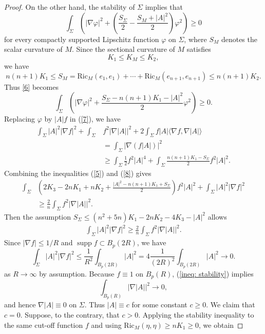 \documentclass[amssymb,amstex,amsmath,11pt]{article}
\numberwithin{equation}{section}
\theoremstyle{plain}
\theoremstyle{definition}
\theoremstyle{remark}
\def\Ric{\textrm{Ric}}
\begin{document}
\begin{proof}
On the other hand, the stability of $\Sigma$ implies that
\begin{equation}\label{6}
\int_\Sigma \left( |\nabla \varphi|^2 + \left(\frac{S_\Sigma}{2}-\frac{S_M+|A|^2}{2}\right)\varphi^2 \right)\ge 0
\end{equation}
for every compactly supported Lipschitz function $\varphi$ on $\Sigma$, where $S_M$ denotes the scalar curvature of $M$. Since the sectional curvature of $M$ satisfies
$$
K_1\le K_M\le K_2,
$$
we have
$$
n(n+1)K_1
\le
S_M
=
\Ric_M(e_1,e_1)+\cdots+\Ric_M(e_{n+1},e_{n+1})
\le
n(n+1)K_2.
$$
Thus \eqref{6} becomes
\begin{equation}\label{7}
\int_\Sigma \left(|\nabla \varphi|^2+\frac{S_\Sigma-n(n+1)K_1-|A|^2}{2}\varphi^2\right)\ge 0.
\end{equation}
Replacing $\varphi$ by $|A|f$ in (\ref{7}), we have
\begin{align}\label{8}
\int_\Sigma |A|^2|\nabla f|^2 + \int_\Sigma & f^2|\nabla |A||^2 +  2\int_\Sigma f|A|\langle \nabla f,\nabla|A| \rangle \nonumber \\
&=\int_\Sigma |\nabla (f|A|)|^2 \nonumber \\
& \geq \int_\Sigma \frac{1}{2}f^2|A|^4 + \int_\Sigma \frac{n(n+1)K_1-S_{\Sigma}}{2}f^2|A|^2.
\end{align}
Combining the inequalities (\ref{5}) and (\ref{8}) gives
\begin{align}\label{9}
\int_\Sigma &\left(2K_3-2nK_1+nK_2 +\frac{|A|^2-n(n+1)K_1+S_{\Sigma}}{2}\right) f^2|A|^2 +  \int_\Sigma |A|^2|\nabla f|^2 \nonumber\\
& \geq \frac{2}{n}\int_\Sigma f^2|\nabla |A||^2.
\end{align}
Then the assumption $S_{\Sigma} \leq (n^2+5n)K_1-2n K_2-4 K_3-|A|^2$ allows
\begin{align}
\int_\Sigma |A|^2|\nabla f|^2 \geq \frac{2}{n}\int_\Sigma f^2|\nabla |A||^2. \label{ineq: stability}
\end{align}
Since $|\nabla f|\le 1/R$ and $\operatorname{supp}f\subset B_p(2R)$, we have
$$
\int_\Sigma |A|^2|\nabla f|^2
\le
\frac{1}{R^2}\int_{B_p(2R)}|A|^2
=
4\frac{1}{(2R)^2}\int_{B_p(2R)}|A|^2\rightarrow0.
$$
as $R \rightarrow \infty$ by assumption. Because $f\equiv1$ on $B_p(R)$, (\ref{ineq: stability}) implies
$$
\int_{B_p(R)}|\nabla|A||^2\rightarrow0,
$$
and hence $\nabla|A|\equiv0$ on  $\Sigma$. Thus $|A|\equiv c$ for some constant $c\ge0$. We claim that $c=0$. Suppose, to the contrary, that $c>0$. Applying the stability inequality to the same cut-off function $f$ and using $\Ric_M(\eta,\eta)\ge nK_1\ge0$, we obtain

\end{proof}
\end{document}
